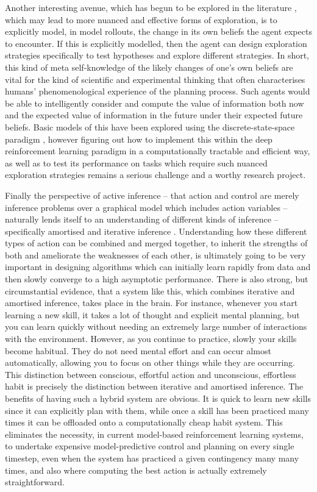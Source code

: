 Another interesting avenue, which has begun to be explored in the literature \citep{friston2020sophisticated}, which may lead to more nuanced and effective forms of exploration, is to explicitly model, in model rollouts, the change in its own beliefs the agent expects to encounter. If this is explicitly modelled, then the agent can design exploration strategies specifically to test hypotheses and explore different strategies. In short, this kind of meta self-knowledge of the likely changes of one's own beliefs are vital for the kind of scientific and experimental thinking that often characterises humans' phenomenological experience of the planning process. Such agents would be able to intelligently consider and compute the value of information both now and the expected value of information in the future under their expected future beliefs. Basic models of this have been explored using the discrete-state-space paradigm \citep{friston2020sophisticated,hesp2020sophisticated}, however figuring out how to implement this within the deep reinforcement learning paradigm in a computationally tractable and efficient way, as well as to test its performance on tasks which require such nuanced exploration strategies remains a serious challenge and a worthy research project.

Finally the perspective of active inference -- that action and control are merely inference problems over a graphical model which includes action variables -- naturally lends itself to an understanding of different kinds of inference -- specifically amortised and iterative inference \citep{millidge2020reinforcement,kim2018semi,marino2018iterative}. Understanding how these different types of action can be combined and merged together, to inherit the strengths of both and ameliorate the weaknesses of each other, is ultimately going to be very important in designing algorithms which can initially learn rapidly from data and then slowly converge to a high asymptotic performance. There is also strong, but circumstantial evidence, that a system like this, which combines iterative and amortised inference, takes place in the brain. For instance, whenever you start learning a new skill, it takes a lot of thought and explicit mental planning, but you can learn quickly without needing an extremely large number of interactions with the environment. However, as you continue to practice, slowly your skills become habitual. They do not need mental effort and can occur almost automatically, allowing you to focus on other things while they are occurring. This distinction between conscious, effortful action and unconscious, effortless habit is precisely the distinction between iterative and amortised inference. The benefits of having such a hybrid system are obvious. It is quick to learn new skills since it can explicitly plan with them, while once a skill has been practiced many times it can be offloaded onto a computationally cheap habit system. This eliminates the necessity, in current model-based reinforcement learning systems, to undertake expensive model-predictive control and planning on every single timestep, even when the system has practiced a given contingency many many times, and also where computing the best action is actually extremely straightforward.

